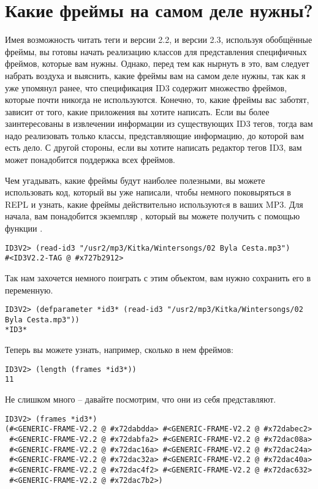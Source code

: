 \section{Какие фреймы на самом деле нужны?}

Имея возможность читать теги и версии 2.2, и версии 2.3, используя обобщённые фреймы, вы
готовы начать реализацию классов для представления специфичных фреймов, которые вам
нужны. Однако, перед тем как нырнуть в это, вам следует набрать воздуха и выяснить, какие
фреймы вам на самом деле нужны, так как я уже упомянул ранее, что спецификация ID3
содержит множество фреймов, которые почти никогда не используются. Конечно, то, какие
фреймы вас заботят, зависит от того, какие приложения вы хотите написать. Если вы более
заинтересованы в извлечении информации из существующих ID3 тегов, тогда вам надо
реализовать только классы, представляющие информацию, до которой вам есть дело. С другой
стороны, если вы хотите написать редактор тегов ID3, вам может понадобится поддержка всех
фреймов.

Чем угадывать, какие фреймы будут наиболее полезными, вы можете использовать код, который
вы уже написали, чтобы немного поковыряться в REPL и узнать, какие фреймы действительно
используютcя в ваших MP3. Для начала, вам понадобится экземпляр , который вы
можете получить с помощью функции .

\begin{lstlisting}
ID3V2> (read-id3 "/usr2/mp3/Kitka/Wintersongs/02 Byla Cesta.mp3")
#<ID3V2.2-TAG @ #x727b2912>
\end{lstlisting}

Так нам захочется немного поиграть с этим объектом, вам нужно сохранить его в переменную.

\begin{lstlisting}
ID3V2> (defparameter *id3* (read-id3 "/usr2/mp3/Kitka/Wintersongs/02 Byla Cesta.mp3"))
*ID3*
\end{lstlisting}

Теперь вы можете узнать, например, сколько в нем фреймов:

\begin{lstlisting}
ID3V2> (length (frames *id3*))
11
\end{lstlisting}

Не слишком много -- давайте посмотрим, что они из себя представляют.

\begin{lstlisting}
ID3V2> (frames *id3*)
(#<GENERIC-FRAME-V2.2 @ #x72dabdda> #<GENERIC-FRAME-V2.2 @ #x72dabec2>
 #<GENERIC-FRAME-V2.2 @ #x72dabfa2> #<GENERIC-FRAME-V2.2 @ #x72dac08a>
 #<GENERIC-FRAME-V2.2 @ #x72dac16a> #<GENERIC-FRAME-V2.2 @ #x72dac24a>
 #<GENERIC-FRAME-V2.2 @ #x72dac32a> #<GENERIC-FRAME-V2.2 @ #x72dac40a>
 #<GENERIC-FRAME-V2.2 @ #x72dac4f2> #<GENERIC-FRAME-V2.2 @ #x72dac632>
 #<GENERIC-FRAME-V2.2 @ #x72dac7b2>)
\end{lstlisting}


